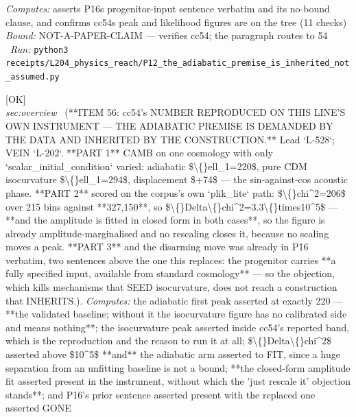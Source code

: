 \begin{description}
\emph{Computes:} asserts P16s progenitor-input sentence verbatim and its no-bound clause, and confirms cc54s peak and likelihood figures are on the tree (11 checks)
 \emph{Bound:} NOT-A-PAPER-CLAIM --- verifies cc54; the paragraph routes to 54
\ \emph{Run:} \texttt{python3 receipts/L204\_physics\_reach/P12\_the\_adiabatic\_premise\_is\_inherited\_not\_assumed.py}
\item[\rcptlabel{P16_the_adiabatic_premise_is_demanded_by_the_data_and_inherited_by_the_construction}{P16R27}\textbf{P16R27}\quad\texttt{P16\_the\_adiabatic\_premise\_is\_demanded\_by\_the\_data\_and\_inherited\_by\_the\_construction}]\hfill\textsf{[OK]}\\
\textit{sec:overview} \ (**ITEM 56: cc54's NUMBER REPRODUCED ON THIS LINE'S OWN INSTRUMENT --- THE ADIABATIC PREMISE IS DEMANDED BY THE DATA AND INHERITED BY THE CONSTRUCTION.** Lead `L-528`; VEIN `L-202`. **PART 1** CAMB on one cosmology with only `scalar\_initial\_condition` varied: adiabatic \$\textbackslash\{\}ell\_1=220\$, pure CDM isocurvature \$\textbackslash\{\}ell\_1=294\$, displacement \$+74\$ --- the sin-against-cos acoustic phase. **PART 2** scored on the corpus's own `plik\_lite` path: \$\textbackslash\{\}chi\textasciicircum{}2=206\$ over 215 bins against **327,150**, so \$\textbackslash\{\}Delta\textbackslash\{\}chi\textasciicircum{}2=3.3\textbackslash\{\}times10\textasciicircum{}5\$ --- **and the amplitude is fitted in closed form in both cases**, so the figure is already amplitude-marginalised and no rescaling closes it, because no scaling moves a peak. **PART 3** and the disarming move was already in P16 verbatim, two sentences above the one this replaces: the progenitor carries **a fully specified input, available from standard cosmology** --- so the objection, which kills mechanisms that SEED isocurvature, does not reach a construction that INHERITS.). 
\emph{Computes:} the adiabatic first peak asserted at exactly 220 --- **the validated baseline; without it the isocurvature figure has no calibrated side and means nothing**; the isocurvature peak asserted inside cc54's reported band, which is the reproduction and the reason to run it at all; \$\textbackslash\{\}Delta\textbackslash\{\}chi\textasciicircum{}2\$ asserted above \$10\textasciicircum{}5\$ **and** the adiabatic arm asserted to FIT, since a huge separation from an unfitting baseline is not a bound; **the closed-form amplitude fit asserted present in the instrument, without which the 'just rescale it' objection stands**; and P16's prior sentence asserted present with the replaced one asserted GONE

\end{description}
